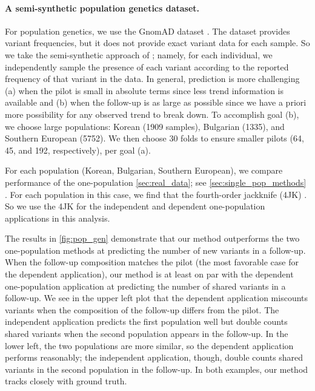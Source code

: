 \paragraph{A semi-synthetic population genetics dataset.}

For population genetics, we use the GnomAD dataset \citep{karczewski2020mutational}. The dataset provides variant frequencies, but it does not provide exact variant data for each sample. So we take the semi-synthetic approach of \citet{Masoero2022}; namely, for each individual, we independently sample the presence of each variant according to the reported frequency of that variant in the data. In general, prediction is more challenging (a) when the pilot is small in absolute terms since less trend information is available 
and (b) when the follow-up is as large as possible since we have a priori more possibility for any observed trend to break down. To accomplish goal (b), we choose large populations: Korean (1909 samples), Bulgarian (1335), and Southern European (5752). We then choose 30 folds to ensure smaller pilots 
(64, 45, and 192, respectively), per goal (a).

For each population (Korean, Bulgarian, Southern European), we compare performance of the one-population  \cref{sec:real_data}; see \cref{sec:single_pop_methods} . For each population in this case, we find that the fourth-order jackknife (4JK) . So we use the 4JK for the independent and dependent one-population applications in this analysis.

The results in \cref{fig:pop_gen} demonstrate that our method outperforms the two one-population methods at predicting the number of new variants in a follow-up. When the follow-up composition matches the pilot (the most favorable case for the dependent application), our method is at least on par with the dependent one-population application at predicting the number of shared variants in a follow-up. 
We see in the upper left plot that the dependent application miscounts variants when the composition of the follow-up differs from the pilot. The independent application predicts the first population well but double counts shared variants when the second population appears in the follow-up. In the lower left, the two populations are more similar, so the dependent application performs reasonably; the independent application, though, double counts shared variants in the second population in the follow-up. In both examples, our method tracks closely with ground truth. 

